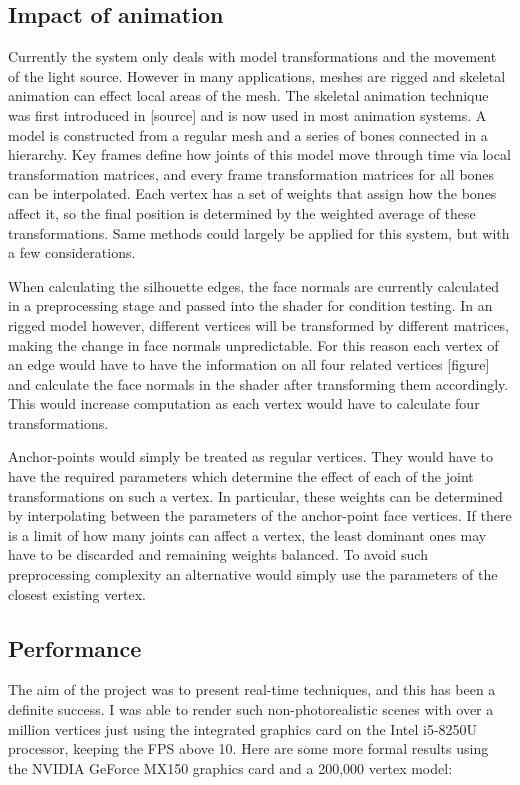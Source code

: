 \documentclass[a4paper, 12pt]{article}
\begin{document}
\subsection{Impact of animation}
Currently the system only deals with model transformations and the movement of the light source. However in many applications, meshes are rigged and skeletal animation can effect local areas of the mesh. The skeletal animation technique was first introduced in [source] and is now used in most animation systems. A model is constructed from a regular mesh and a series of bones connected in a hierarchy. Key frames define how joints of this model move through time via local transformation matrices, and every frame transformation matrices for all bones can be interpolated. Each vertex has a set of weights that assign how the bones affect it, so the final position is determined by the weighted average of these transformations. Same methods could largely be applied for this system, but with a few considerations.

When calculating the silhouette edges, the face normals are currently calculated in a preprocessing stage and passed into the shader for condition testing. In an rigged model however, different vertices will be transformed by different matrices, making the change in face normals unpredictable. For this reason each vertex of an edge would have to have the information on all four related vertices [figure] and calculate the face normals in the shader after transforming them accordingly. This would increase computation as each vertex would have to calculate four transformations.

Anchor-points would simply be treated as regular vertices. They would have to have the required parameters which determine the effect of each of the joint transformations on such a vertex. In particular, these weights can be determined by interpolating between the parameters of the anchor-point face vertices. If there is a limit of how many joints can affect a vertex, the least dominant ones may have to be discarded and remaining weights balanced. To avoid such preprocessing complexity an alternative would simply use the parameters of the closest existing vertex.

\subsection{Performance}
The aim of the project was to present real-time techniques, and this has been a definite success. I was able to render such non-photorealistic scenes with over a million vertices just using the integrated graphics card on the Intel i5-8250U processor, keeping the FPS above 10. Here are some more formal results using the NVIDIA GeForce MX150 graphics card and a 200,000 vertex model:
\end{document}
